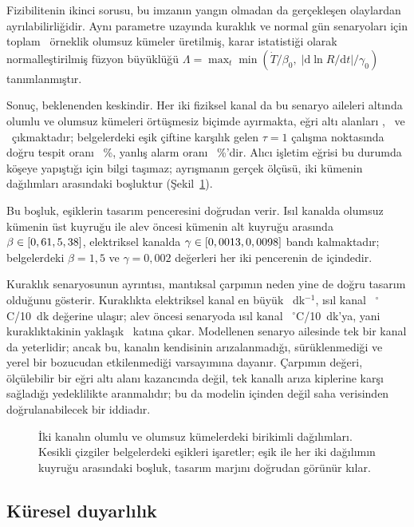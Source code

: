 \documentclass[11pt,a4paper]{article}
\newcommand{\dd}{\mathrm{d}}
\begin{document}
Fizibilitenin ikinci sorusu, bu imzanın yangın olmadan da gerçekleşen
olaylardan ayrılabilirliğidir. Aynı parametre uzayında kuraklık ve normal gün
senaryoları için toplam \mcNeg\ örneklik olumsuz kümeler üretilmiş, karar
istatistiği olarak normalleştirilmiş füzyon büyüklüğü
$\Lambda = \max_t \min\!\left(\dot T/\beta_0,\;|\dd\ln R/\dd t|/\gamma_0\right)$
tanımlanmıştır.

Sonuç, beklenenden keskindir. Her iki fiziksel kanal da bu senaryo aileleri
altında olumlu ve olumsuz kümeleri örtüşmesiz biçimde ayırmakta, eğri altı
alanları \aucFusion, \aucBeta\ ve \aucGamma\ çıkmaktadır; belgelerdeki eşik
çiftine karşılık gelen $\tau = 1$ çalışma noktasında doğru tespit oranı
\tprOne~\%, yanlış alarm oranı \fprOne~\%'dir. Alıcı işletim eğrisi bu durumda
köşeye yapıştığı için bilgi taşımaz; ayrışmanın gerçek ölçüsü, iki kümenin
dağılımları arasındaki boşluktur (Şekil~\ref{fig:separation}).

Bu boşluk, eşiklerin tasarım penceresini doğrudan verir. Isıl kanalda olumsuz
kümenin üst kuyruğu ile alev öncesi kümenin alt kuyruğu arasında
$\beta \in [0,61, 5,38]$, elektriksel kanalda
$\gamma \in [0,0013, 0,0098]$ bandı kalmaktadır; belgelerdeki
$\beta = 1{,}5$ ve $\gamma = 0{,}002$ değerleri her iki pencerenin de içindedir.

Kuraklık senaryosunun ayrıntısı, mantıksal çarpımın neden yine de doğru tasarım
olduğunu gösterir. Kuraklıkta elektriksel kanal en büyük \droughtdlnR~dk$^{-1}$,
ısıl kanal \droughtdT~$^\circ$C/10~dk değerine ulaşır; alev öncesi senaryoda
ısıl kanal \maxdTdt~$^\circ$C/10~dk'ya, yani kuraklıktakinin yaklaşık \sepBeta\
katına çıkar. Modellenen senaryo ailesinde tek bir kanal da yeterlidir; ancak
bu, kanalın kendisinin arızalanmadığı, sürüklenmediği ve yerel bir bozucudan
etkilenmediği varsayımına dayanır. Çarpımın değeri, ölçülebilir bir eğri altı
alanı kazancında değil, tek kanallı arıza kiplerine karşı sağladığı
yedeklilikte aranmalıdır; bu da modelin içinden değil saha verisinden
doğrulanabilecek bir iddiadır.

\begin{figure}[htbp]\centering

\caption{İki kanalın olumlu ve olumsuz kümelerdeki birikimli dağılımları.
Kesikli çizgiler belgelerdeki eşikleri işaretler; eşik ile her iki dağılımın
kuyruğu arasındaki boşluk, tasarım marjını doğrudan görünür kılar.}
\label{fig:separation}
\end{figure}

\subsection{Küresel duyarlılık}
\end{document}
